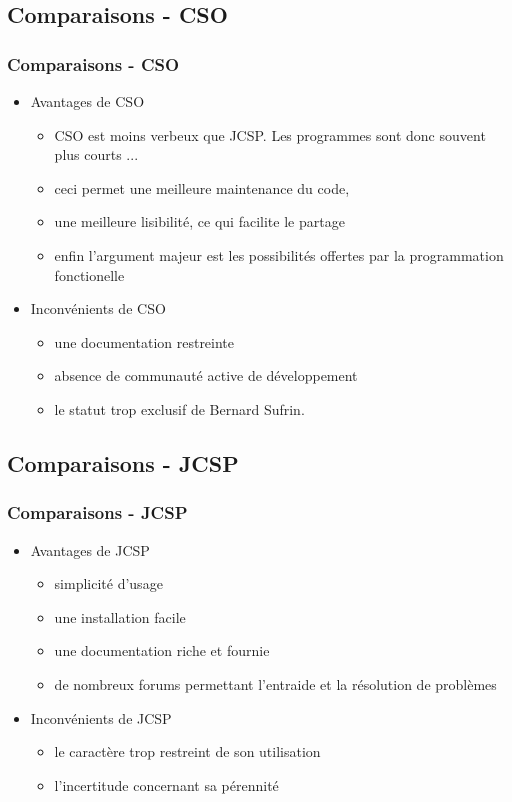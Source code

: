 \documentclass[slidetop,11pt]{beamer}
\begin{document}
\subsection{Comparaisons - CSO}
\begin{frame}
\frametitle{Comparaisons - CSO}
\begin{itemize}[<+->]
\item Avantages de CSO
\begin{itemize}[<+->]
\item CSO est moins verbeux que JCSP. Les programmes sont donc souvent plus courts ...
\item ceci permet une meilleure maintenance du code,
\item une meilleure lisibilité, ce qui facilite le partage
\item enfin l'argument majeur est les possibilités offertes par la programmation fonctionelle
\end{itemize}
\item Inconvénients de CSO
\begin{itemize}[<+->]
\item une documentation restreinte
\item absence de communauté active de développement
\item le statut trop exclusif de Bernard Sufrin.
\end{itemize}
\end{itemize}
\end{frame}

\subsection{Comparaisons - JCSP}
\begin{frame}
\frametitle{Comparaisons - JCSP}
\begin{itemize}[<+->]
\item Avantages de JCSP
\begin{itemize}[<+->]
\item simplicité d'usage
\item une installation facile 
\item une documentation riche et fournie
\item de nombreux forums permettant l'entraide et la résolution de problèmes
\end{itemize}
\item Inconvénients de JCSP
\begin{itemize}[<+->]
\item le caractère trop restreint de son utilisation
\item l'incertitude concernant sa pérennité
\end{itemize}
\end{itemize}
\end{frame}
\end{document}
